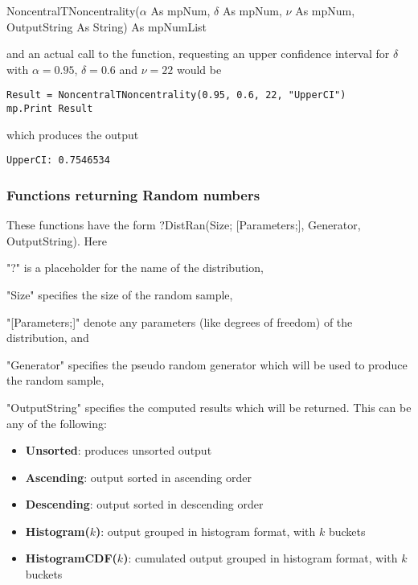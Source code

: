 \vspace{0.3cm}
\textsf{NoncentralTNoncentrality($\alpha$ As mpNum, $\delta$ As mpNum, $\nu$ As mpNum, OutputString As String) As mpNumList}

\vspace{0.3cm}
and an actual call to the function, requesting an upper confidence interval for $\delta$ with $\alpha = 0.95$, $\delta = 0.6$ and $\nu=22$   would be

\begin{lstlisting}
Result = NoncentralTNoncentrality(0.95, 0.6, 22, "UpperCI")
mp.Print Result
\end{lstlisting}
which produces the output

\begin{verbatim}
UpperCI: 0.7546534
\end{verbatim}



\newpage
\subsubsection{Functions returning Random numbers}
\label{Functions returning Random numbers}
These functions have the form \textsf{?DistRan(Size; [Parameters;], Generator, OutputString)}.
Here 

"?" is a placeholder for the name of the distribution, 

"Size" specifies the size of the random sample, 

"[Parameters;]" denote any parameters (like degrees of freedom) of the distribution, and 

"Generator" specifies the pseudo random generator which will be used to produce the random sample, 

"OutputString" specifies the computed results which will be returned. This can be any of the following:

\begin{itemize}
	\item \textbf{Unsorted}: produces unsorted output
	\item \textbf{Ascending}: output sorted in ascending order
	\item \textbf{Descending}: output sorted in descending order
	\item \textbf{Histogram($k$)}: output grouped in histogram format, with $k$ buckets
	\item \textbf{HistogramCDF($k$)}: cumulated output grouped in histogram format, with $k$ buckets
	
\end{itemize}


